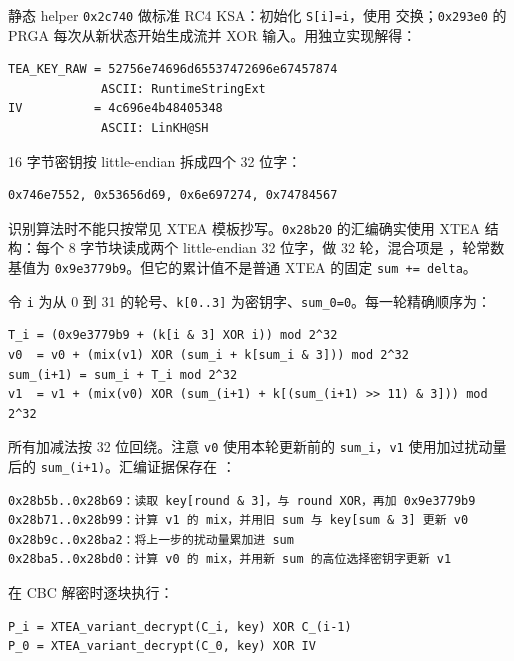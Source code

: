 静态 helper \texttt{0x2c740} 做标准 RC4 KSA：初始化 \texttt{S{[}i{]}=i}，使用 \texttt{} 交换；\texttt{0x293e0} 的 PRGA 每次从新状态开始生成流并 XOR 输入。用独立实现解得：

\begin{verbatim}
TEA_KEY_RAW = 52756e74696d65537472696e67457874
             ASCII: RuntimeStringExt
IV          = 4c696e4b48405348
             ASCII: LinKH@SH
\end{verbatim}

16 字节密钥按 little-endian 拆成四个 32 位字：

\begin{verbatim}
0x746e7552, 0x53656d69, 0x6e697274, 0x74784567
\end{verbatim}

识别算法时不能只按常见 XTEA 模板抄写。\texttt{0x28b20} 的汇编确实使用 XTEA 结构：每个 8 字节块读成两个 little-endian 32 位字，做 32 轮，混合项是 \texttt{}，轮常数基值为 \texttt{0x9e3779b9}。但它的累计值不是普通 XTEA 的固定 \texttt{sum\ +=\ delta}。

令 \texttt{i} 为从 0 到 31 的轮号、\texttt{k{[}0..3{]}} 为密钥字、\texttt{sum\_0=0}。每一轮精确顺序为：

\begin{verbatim}
T_i = (0x9e3779b9 + (k[i & 3] XOR i)) mod 2^32
v0  = v0 + (mix(v1) XOR (sum_i + k[sum_i & 3])) mod 2^32
sum_(i+1) = sum_i + T_i mod 2^32
v1  = v1 + (mix(v0) XOR (sum_(i+1) + k[(sum_(i+1) >> 11) & 3])) mod 2^32
\end{verbatim}

所有加减法按 32 位回绕。注意 \texttt{v0} 使用本轮更新前的 \texttt{sum\_i}，\texttt{v1} 使用加过扰动量后的 \texttt{sum\_(i+1)}。汇编证据保存在 \texttt{}：

\begin{verbatim}
0x28b5b..0x28b69：读取 key[round & 3]，与 round XOR，再加 0x9e3779b9
0x28b71..0x28b99：计算 v1 的 mix，并用旧 sum 与 key[sum & 3] 更新 v0
0x28b9c..0x28ba2：将上一步的扰动量累加进 sum
0x28ba5..0x28bd0：计算 v0 的 mix，并用新 sum 的高位选择密钥字更新 v1
\end{verbatim}

在 CBC 解密时逐块执行：

\begin{verbatim}
P_i = XTEA_variant_decrypt(C_i, key) XOR C_(i-1)
P_0 = XTEA_variant_decrypt(C_0, key) XOR IV
\end{verbatim}


